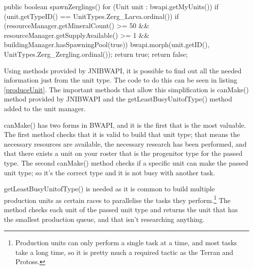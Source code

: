\documentclass[11pt,openright,a4paper]{report}
\begin{document}
\begin{Code}[frame=single,language=Java,breaklines,breakatwhitespace,caption={The original method used to produce a Zergling\protect\footnote{Zerglings are the basic unit of a Zerg player's army. They are small, fast, and have a melee attack}},label=spawnZergling]
public boolean spawnZerglings(){
    for (Unit unit : bwapi.getMyUnits()) {
        if (unit.getTypeID() == UnitTypes.Zerg_Larva.ordinal()) {
            if (resourceManager.getMineralCount() >= 50 && resourceManager.getSupplyAvailable() >= 1 && buildingManager.hasSpawningPool(true))
            {
                bwapi.morph(unit.getID(), UnitTypes.Zerg_Zergling.ordinal());
                return true;
            }
        }
    }
    return false;
}
\end{Code}

Using methods provided by JNIBWAPI, it is possible to find out all the needed information just from the unit type. The code to do this can be seen in listing \ref{produceUnit}. The important methods that allow this simplification is canMake() method provided by JNIBWAPI and the getLeastBusyUnitofType() method added to the unit manager.

canMake() has two forms in BWAPI, and it is the first that is the most valuable. The first method checks that it is valid to build that unit type; that means the necessary resources are available, the necessary research has been performed, and that there exists a unit on your roster that is the progenitor type for the passed type. The second canMake() method checks if a specific unit can make the passed unit type; so it's the correct type and it is not busy with another task.

getLeastBusyUnitofType() is needed as it is common to build multiple production units as certain races to parallelise the tasks they perform.\footnote{Production units can only perform a single task at a time, and most tasks take a long time, so it is pretty much a required tactic as the Terran and Protoss.} The method checks each unit of the passed unit type and returns the unit that has the smallest production queue, and that isn't researching anything.
\end{document}
